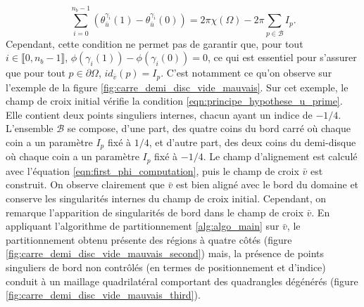 \begin{equation}
    \sum_{i=0}^{n_b-1}\left(\theta_{\bar{u}}^{\gamma_i}(1)-\theta_{\bar{u}}^{\gamma_i}(0)\right)=2\pi\chi(\Omega)-2\pi\sum_{p\in\mathcal{B}}I_p.
    \label{eqn:principe_hypothese_u_prime}
\end{equation}
Cependant, cette condition ne permet pas de garantir que, pour tout $i\in\llbracket0, n_b-1\rrbracket$, $\phi(\gamma_i(1))-\phi(\gamma_i(0))=0$, ce qui est essentiel pour s'assurer que pour tout $p\in\partial \Omega$, $id_{\bar{v}}(p)= I_p$. C'est notamment ce qu'on observe sur l'exemple de la figure \ref{fig:carre_demi_disc_vide_mauvais}. Sur cet exemple, le champ de croix initial vérifie la condition \eqref{eqn:principe_hypothese_u_prime}. Elle contient deux points singuliers internes, chacun ayant un indice de $-1/4$. L'ensemble $\mathcal{B}$ se compose, d'une part, des quatre coins du bord carré où chaque coin a un paramètre $I_p$ fixé à $1/4$, et d'autre part, des deux coins du demi-disque où chaque coin a un paramètre $I_p$ fixé à $-1/4$. Le champ d'alignement est calculé avec l'équation \eqref{eqn:first_phi_computation}, puis le champ de croix $\bar{v}$ est construit. On observe clairement que $\bar{v}$ est bien aligné avec le bord du domaine et conserve les singularités internes du champ de croix initial. Cependant, on remarque l'apparition de singularités de bord dans le champ de croix $\bar{v}$. En appliquant l'algorithme de partitionnement \ref{alg:algo_main} sur $\bar{v}$, le partitionnement obtenu présente des régions à quatre côtés (figure \ref{fig:carre_demi_disc_vide_mauvais_second}) mais, la présence de points singuliers de bord non contrôlés (en termes de positionnement et d'indice) conduit à un maillage quadrilatéral comportant des quadrangles dégénérés (figure \ref{fig:carre_demi_disc_vide_mauvais_third}).

